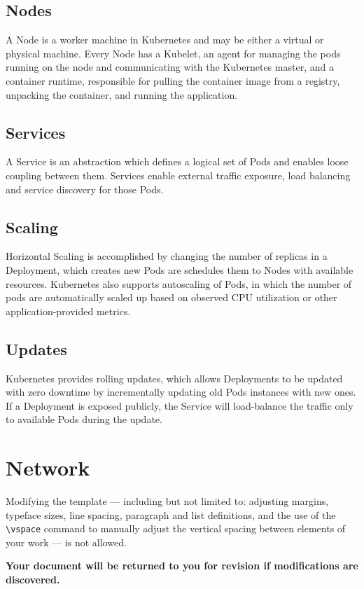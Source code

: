 \documentclass[sigconf]{acmart}
\begin{document}
\subsection{Nodes}
A Node is a worker machine in Kubernetes and may be either a virtual or physical machine. Every Node has a Kubelet, an agent for managing the pods running on the node and communicating with the Kubernetes master, and a container runtime, responsible for pulling the container image from a registry, unpacking the container, and running the application.

\subsection{Services}
A Service is an abstraction which defines a logical set of Pods and enables loose coupling between them. Services enable external traffic exposure, load balancing and service discovery for those Pods. 

\subsection{Scaling}
Horizontal Scaling is accomplished by changing the number of replicas in a Deployment, which creates new Pods are schedules them to Nodes with available resources. Kubernetes also supports autoscaling of Pods, in which the number of pods are automatically scaled up based on observed CPU utilization or other application-provided metrics.

\subsection{Updates}
Kubernetes provides rolling updates, which allows Deployments to be updated with zero downtime by incrementally updating old Pods instances with new ones. If a Deployment is exposed publicly, the Service will load-balance the traffic only to available Pods during the update.

\section{Network}

Modifying the template --- including but not limited to: adjusting
margins, typeface sizes, line spacing, paragraph and list definitions,
and the use of the \verb|\vspace| command to manually adjust the
vertical spacing between elements of your work --- is not allowed.

{\bfseries Your document will be returned to you for revision if
  modifications are discovered.}
\end{document}
